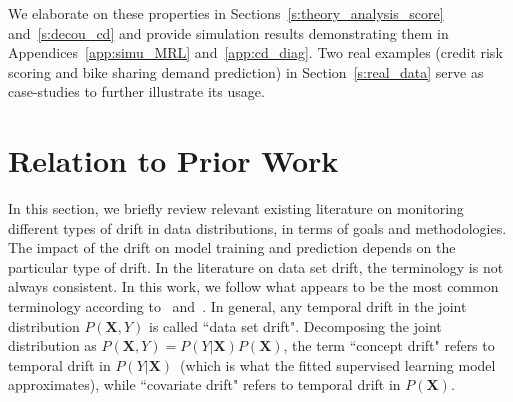 \documentclass[twoside,11pt]{article}
\begin{document}



We elaborate on these properties in Sections~\ref{s:theory_analysis_score} and~\ref{s:decou_cd} and provide simulation results demonstrating them in Appendices~\ref{app:simu_MRL} and~\ref{app:cd_diag}. Two real examples (credit risk scoring and bike sharing demand prediction) in Section~\ref{s:real_data} serve as case-studies to further illustrate its usage.

\section{Relation to Prior Work}
\label{s:review}
In this section, we briefly review relevant existing literature on monitoring different types of drift in data distributions, in terms of goals and methodologies. The impact of the drift on model training and prediction depends on the particular type of drift. In the literature on data set drift, the terminology is not always consistent. In this work, we follow what appears to be the most common terminology according to~\cite{moreno2012unifying} and~\cite{vzliobaite2016overview}. In general, any temporal drift in the joint distribution $P(\bm {X}, Y)$ is called ``data set drift". Decomposing the joint distribution as $P(\bm{X}, Y) = P(Y|\bm{X})P(\bm {X})$, the term ``concept drift" refers to temporal drift in $P(Y|\bm{X})$~(which is what the fitted supervised learning model approximates), while ``covariate drift" refers to temporal drift in $P(\bm{X})$.
\end{document}
